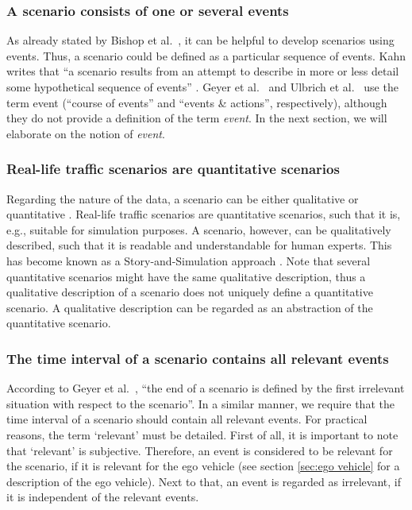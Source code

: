 \subsubsection{A scenario consists of one or several events \cite{vannotten2003updated, go2004blind, geyer2014, ulbrich2015, kahn1962, englund2016grand, schoemaker1993multiple, cuppens2002alert, bach2016modelbased}}
As already stated by Bishop et al.\ \cite{bishop2007scentechniques}, it can be helpful to develop scenarios using events. Thus, a scenario could be defined as a particular sequence of events.  Kahn writes that ``a scenario results from an attempt to describe in more or less detail some hypothetical sequence of events'' \cite{kahn1962}. Geyer et al.\ \cite{geyer2014} and Ulbrich et al.\ \cite{ulbrich2015} use the term event (``course of events'' and ``events \& actions'', respectively), although they do not provide a definition of the term \emph{event}. In the next section, we will elaborate on the notion of \emph{event}.

\subsubsection{Real-life traffic scenarios are quantitative scenarios}
Regarding the nature of the data, a scenario can be either qualitative or quantitative \cite{vannotten2003updated}. Real-life traffic scenarios are quantitative scenarios, such that it is, e.g., suitable for simulation purposes. A scenario, however, can be qualitatively described, such that it is readable and understandable for human experts. This has become known as a Story-and-Simulation approach \cite{alcamo2001scenarios}. Note that several quantitative scenarios might have the same qualitative description, thus a qualitative description of a scenario does not uniquely define a quantitative scenario. A qualitative description can be regarded as an abstraction of the quantitative scenario.
	
\subsubsection{The time interval of a scenario contains all relevant events}
According to Geyer et al.\ \cite{geyer2014}, ``the end of a scenario is defined by the first irrelevant situation with respect to the scenario''. In a similar manner, we require that the time interval of a scenario should contain all relevant events. For practical reasons, the term `relevant' must be detailed. First of all, it is important to note that `relevant' is subjective. Therefore, an event is considered to be relevant for the scenario, if it is relevant for the ego vehicle (see section \ref{sec:ego vehicle} for a description of the ego vehicle). Next to that, an event is regarded as irrelevant, if it is independent of the relevant events.
	

